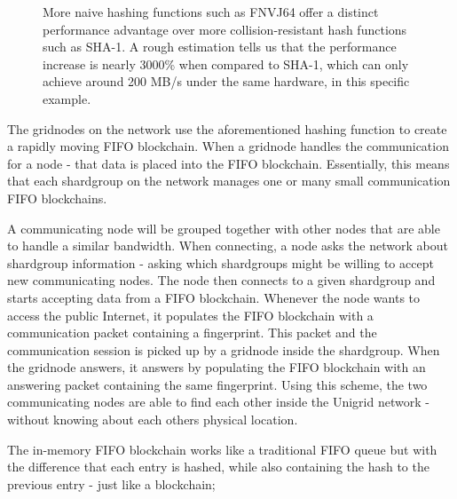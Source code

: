\documentclass[10pt,a4paper,final]{article}
\begin{document}
\begin{figure}[H]
\centering
{}
\caption{More naive hashing functions such as FNVJ64 offer a distinct performance advantage over more collision-resistant hash functions such as SHA-1. A rough estimation tells us that the performance increase is nearly 3000\% when compared to SHA-1, which can only achieve around 200 MB/s \cite{greenrobot} under the same hardware, in this specific example.}
\end{figure}

\noindent The \glspl{gridnode} on the network use the aforementioned hashing function to create a rapidly moving FIFO blockchain. When a \gls{gridnode} handles the communication for a node - that data is placed into the FIFO blockchain. Essentially, this means that each \gls{shardgroup} on the network  manages one or many small communication FIFO blockchains.

A communicating node will be grouped together with other nodes that are able to handle a similar bandwidth. When connecting, a node asks the network about \gls{shardgroup} information - asking which \glspl{shardgroup} might be willing to accept new communicating nodes. The node then connects to a given \gls{shardgroup} and starts accepting data from a FIFO blockchain. Whenever the node wants to access the public Internet, it populates the FIFO blockchain with a communication packet containing a fingerprint. This packet and the communication session is picked up by a \gls{gridnode} inside the \gls{shardgroup}. When the \gls{gridnode} answers, it answers by populating the FIFO blockchain with an answering packet containing the same fingerprint. Using this scheme, the two communicating nodes are able to find each other inside the Unigrid network - without knowing about each others physical location.

The in-memory FIFO blockchain works like a traditional FIFO queue but with the difference that each entry is hashed, while also containing the hash to the previous entry - just like a blockchain;
\end{document}
